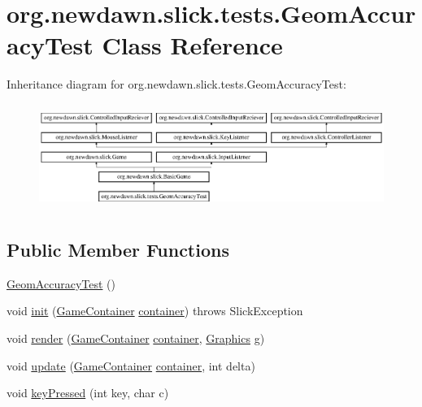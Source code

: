 \hypertarget{classorg_1_1newdawn_1_1slick_1_1tests_1_1_geom_accuracy_test}{}\section{org.\+newdawn.\+slick.\+tests.\+Geom\+Accuracy\+Test Class Reference}
\label{classorg_1_1newdawn_1_1slick_1_1tests_1_1_geom_accuracy_test}
Inheritance diagram for org.\+newdawn.\+slick.\+tests.\+Geom\+Accuracy\+Test\+:\begin{figure}[H]
\begin{center}
\leavevmode
\includegraphics[height=3.469641cm]{classorg_1_1newdawn_1_1slick_1_1tests_1_1_geom_accuracy_test}
\end{center}
\end{figure}
\subsection*{Public Member Functions}
\begin{DoxyCompactItemize}
\item 
\mbox{\hyperlink{classorg_1_1newdawn_1_1slick_1_1tests_1_1_geom_accuracy_test_a7514bf015609473a1d57b310a07f3a01}{Geom\+Accuracy\+Test}} ()
\item 
void \mbox{\hyperlink{classorg_1_1newdawn_1_1slick_1_1tests_1_1_geom_accuracy_test_afd04bccc5bbb9d54d5400934af4c700f}{init}} (\mbox{\hyperlink{classorg_1_1newdawn_1_1slick_1_1_game_container}{Game\+Container}} \mbox{\hyperlink{classorg_1_1newdawn_1_1slick_1_1tests_1_1_geom_accuracy_test_aa36ef5e207393c1e48bdc579da524cf0}{container}})  throws Slick\+Exception 
\item 
void \mbox{\hyperlink{classorg_1_1newdawn_1_1slick_1_1tests_1_1_geom_accuracy_test_a0bc7ca3b337fdf2bc833164e7c19d242}{render}} (\mbox{\hyperlink{classorg_1_1newdawn_1_1slick_1_1_game_container}{Game\+Container}} \mbox{\hyperlink{classorg_1_1newdawn_1_1slick_1_1tests_1_1_geom_accuracy_test_aa36ef5e207393c1e48bdc579da524cf0}{container}}, \mbox{\hyperlink{classorg_1_1newdawn_1_1slick_1_1_graphics}{Graphics}} g)
\item 
void \mbox{\hyperlink{classorg_1_1newdawn_1_1slick_1_1tests_1_1_geom_accuracy_test_a5cac595a85db0faff45f8806f4856b7e}{update}} (\mbox{\hyperlink{classorg_1_1newdawn_1_1slick_1_1_game_container}{Game\+Container}} \mbox{\hyperlink{classorg_1_1newdawn_1_1slick_1_1tests_1_1_geom_accuracy_test_aa36ef5e207393c1e48bdc579da524cf0}{container}}, int delta)
\item 
void \mbox{\hyperlink{classorg_1_1newdawn_1_1slick_1_1tests_1_1_geom_accuracy_test_aa2c33ebecb488f0c0fb343a3e316c961}{key\+Pressed}} (int key, char c)
\end{DoxyCompactItemize}
